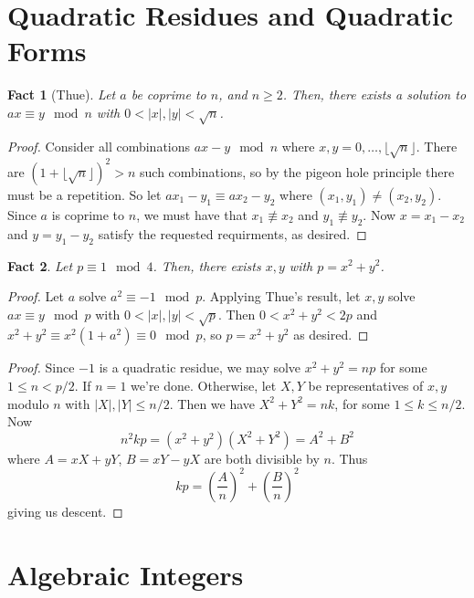 \documentclass[12pt]{article}
\newtheorem*{fact*}{Fact}
\newcommand{\abs}[1]{\left\lvert#1\right\rvert}
\begin{document}
\newpage
\section{Quadratic Residues and Quadratic Forms}

\begin{fact*}[Thue]
Let $a$ be coprime to $n$, and $n\ge 2$. Then, there exists a solution to $ax\equiv y\mod n$ with $0 < \abs{x}, \abs{y} < \sqrt{n}$.
\end{fact*}


\begin{proof}
Consider all combinations $ax-y\mod n$ where $x,y=0,\dots,\lfloor \sqrt{n} \rfloor$. There are $(1+\lfloor \sqrt{n} \rfloor)^2>n$ such combinations, so by the pigeon hole principle there must be a repetition. So let $ax_1-y_1\equiv ax_2-y_2$ where $(x_1,y_1)\neq(x_2,y_2)$. Since $a$ is coprime to $n$, we must have that $x_1\not\equiv x_2$ and $y_1\not\equiv y_2$. Now $x=x_1-x_2$ and $y=y_1-y_2$ satisfy the requested requirments, as desired.
\end{proof}


\begin{fact*}
Let $p\equiv 1\mod 4$. Then, there exists $x,y$ with $p=x^2+y^2$.
\end{fact*}


\begin{proof}
Let $a$ solve $a^2\equiv -1\mod p$. Applying Thue's result, let $x,y$ solve $ax\equiv y\mod p$ with $0 < \abs{x},\abs{y} < \sqrt{p}$. Then $0 < x^2+y^2 < 2p$ and $x^2+y^2\equiv x^2(1+a^2)\equiv 0\mod p$, so $p=x^2+y^2$ as desired.
\end{proof}


\begin{proof}
Since $-1$ is a quadratic residue, we may solve $x^2+y^2=np$ for some $1\le n < p/2$. If $n=1$ we're done. Otherwise, let $X,Y$ be representatives of $x,y$ modulo $n$ with $\abs{X},\abs{Y} \le n/2$. Then we have $X^2+Y^2 = nk$, for some $1\le k\le n/2$. Now
\[n^2kp = (x^2+y^2)(X^2+Y^2) = A^2+B^2\]
where $A = xX+yY$, $B=xY-yX$ are both divisible by $n$. Thus
\[kp = \left(\frac{A}{n}\right)^2 + \left(\frac{B}{n}\right)^2\]
giving us descent.
\end{proof}


\newpage
\section{Algebraic Integers}
\end{document}
